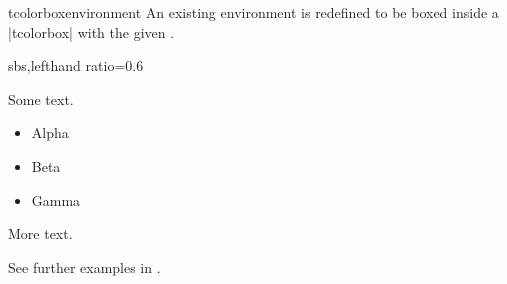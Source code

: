 \begin{docCommand}[doc new=2014-10-20]{tcolorboxenvironment}{}
  An existing environment  is redefined to be boxed inside a
  |tcolorbox| with the given .
\begin{dispExample*}{sbs,lefthand ratio=0.6}
\newenvironment{myitemize}{%
  \begin{itemize}}{\end{itemize}}


Some text.
\begin{myitemize}
\item Alpha
\item Beta
\item Gamma
\end{myitemize}
More text.
\end{dispExample*}

\medskip
See further examples in .
\end{docCommand}

